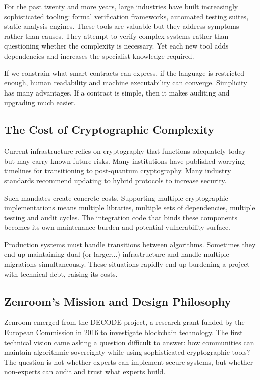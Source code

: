 For the past twenty and more years, large industries have built
increasingly sophisticated tooling: formal verification frameworks,
automated testing suites, static analysis engines. These tools are
valuable but they address symptoms rather than causes. They attempt to
verify complex systems rather than questioning whether the complexity
is necessary. Yet each new tool adds dependencies and increases the
specialist knowledge required.

If we constrain what smart contracts can express, if the language is
restricted enough, human readability and machine executability can
converge. Simplicity has many advantages. If a contract is simple,
then it makes auditing and upgrading much easier.

\subsection{The Cost of Cryptographic Complexity}

Current infrastructure relies on cryptography that functions
adequately today but may carry known future risks. Many institutions
have published worrying timelines for transitioning to post-quantum
cryptography. Many industry standards recommend updating to hybrid
protocols to increase security.

Such mandates create concrete costs. Supporting multiple
cryptographic implementations means multiple libraries, multiple sets
of dependencies, multiple testing and audit cycles.  The integration
code that binds these components becomes its own maintenance burden
and potential vulnerability surface.

Production systems must handle transitions between
algorithms. Sometimes they end up maintaining dual (or larger...)
infrastructure and handle multiple migrations simultaneously. These
situations rapidly end up burdening a project with technical debt,
raising its costs.

\subsection{Zenroom's Mission and Design Philosophy}

Zenroom emerged from the DECODE project, a research grant funded by
the European Commission in 2016 to investigate blockchain technology.
The first technical vision came asking a question difficult to answer:
how communities can maintain algorithmic sovereignty while using
sophisticated cryptographic tools? The question is not whether experts
can implement secure systems, but whether non-experts can audit and
trust what experts build.

